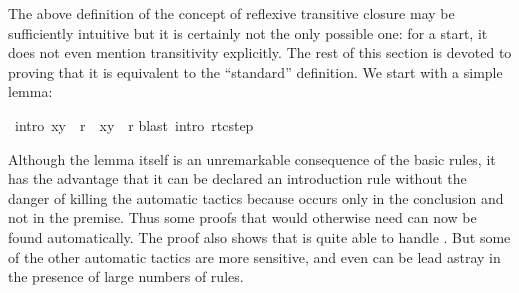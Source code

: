 \begin{isabellebody}
\begin{isamarkuptext}
The above definition of the concept of reflexive transitive closure may
be sufficiently intuitive but it is certainly not the only possible one:
for a start, it does not even mention transitivity explicitly.
The rest of this section is devoted to proving that it is equivalent to
the ``standard'' definition. We start with a simple lemma:%
\end{isamarkuptext}%
\ {\isacharbrackleft}intro{\isacharbrackright}{\isacharcolon}\ {\isachardoublequote}{\isacharparenleft}x{\isacharcomma}y{\isacharparenright}\ {\isacharcolon}\ r\ {\isasymLongrightarrow}\ {\isacharparenleft}x{\isacharcomma}y{\isacharparenright}\ {\isasymin}\ r{\isacharasterisk}{\isachardoublequote}\isanewline
{}blast\ intro{\isacharcolon}\ rtc{\isacharunderscore}step{\isacharparenright}%
\begin{isamarkuptext}%
\noindent
Although the lemma itself is an unremarkable consequence of the basic rules,
it has the advantage that it can be declared an introduction rule without the
danger of killing the automatic tactics because  occurs only in
the conclusion and not in the premise. Thus some proofs that would otherwise
need  can now be found automatically. The proof also
shows that  is quite able to handle . But
some of the other automatic tactics are more sensitive, and even  can be lead astray in the presence of large numbers of rules.


\end{isamarkuptext}
\end{isabellebody}
